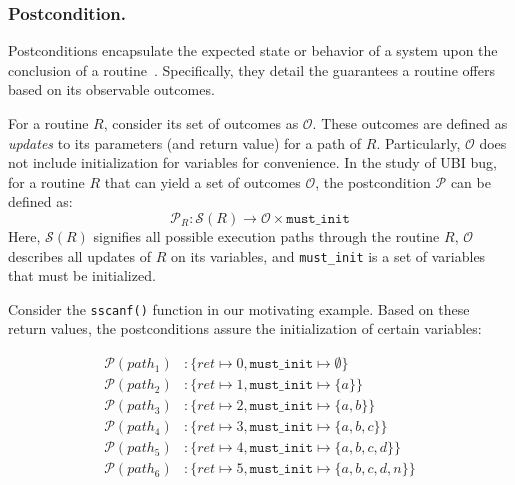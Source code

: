 \subsubsection{Postcondition.}

Postconditions encapsulate the expected state or behavior of a system upon the conclusion of a routine~\cite{DBLP:books/ph/Meyer97}. Specifically, they detail the guarantees a routine offers based on its observable outcomes.

For a routine \( R \), consider its set of outcomes as
\(\mathcal{O}\). These outcomes are defined as \textit{updates} to its parameters (and return value) for a path of \(R\). Particularly, \(\mathcal{O}\) does not include
initialization for variables for convenience.
In the study of UBI bug, for a routine \( R \) that can yield a set of outcomes \( \mathcal{O} \), the postcondition \(\mathcal{P}\)
can be defined as:
\begin{equation}
\mathcal{P}_R: \mathcal{S}(R) \rightarrow  \mathcal{O} \times \texttt{must\_init}
\end{equation}
Here, \(\mathcal{S}(R)\) signifies all possible execution paths through the routine \(R\), 
\(\mathcal{O}\) describes all updates of \(R\) on its variables, and
\texttt{must\_init} is a set of variables that must be initialized. 



Consider the \texttt{sscanf()} function in our motivating example. 
Based on these return values, the postconditions assure the initialization of certain variables:

\begin{align*}
    \mathcal{P}(path_1) &: \{{ret \mapsto 0}, \texttt{must\_init} \mapsto \emptyset \} \\
    \mathcal{P}(path_2) &: \{{ret \mapsto 1}, \texttt{must\_init} \mapsto \{a\} \} \\
    \mathcal{P}(path_3) &: \{{ret \mapsto 2}, \texttt{must\_init} \mapsto \{a,b\} \} \\
    \mathcal{P}(path_4) &: \{{ret \mapsto 3}, \texttt{must\_init} \mapsto \{a,b,c\} \} \\
    \mathcal{P}(path_5) &: \{{ret \mapsto 4}, \texttt{must\_init} \mapsto \{a,b,c,d\} \} \\
    \mathcal{P}(path_6) &: \{{ret \mapsto 5}, \texttt{must\_init} \mapsto \{a,b,c,d,n\} \} \\
\end{align*}

